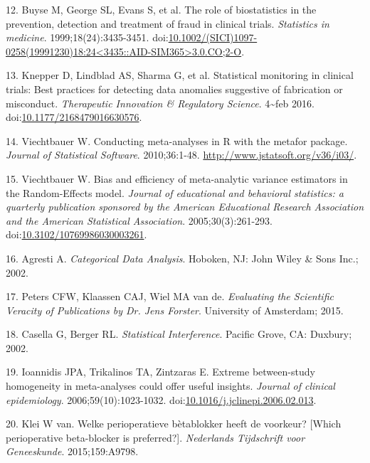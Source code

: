 \documentclass[]{article}
\begin{document}
\hypertarget{ref-Buyse1999-jq}{}
12. Buyse M, George SL, Evans S, et al. The role of biostatistics in the
prevention, detection and treatment of fraud in clinical trials.
\emph{Statistics in medicine}. 1999;18(24):3435-3451.
doi:\href{https://doi.org/10.1002/(SICI)1097-0258(19991230)18:24\%3C3435::AID-SIM365\%3E3.0.CO;2-O}{10.1002/(SICI)1097-0258(19991230)18:24\textless{}3435::AID-SIM365\textgreater{}3.0.CO;2-O}.

\hypertarget{ref-Knepper2016-la}{}
13. Knepper D, Lindblad AS, Sharma G, et al. Statistical monitoring in
clinical trials: Best practices for detecting data anomalies suggestive
of fabrication or misconduct. \emph{Therapeutic Innovation \& Regulatory
Science}. 4\textasciitilde{}feb 2016.
doi:\href{https://doi.org/10.1177/2168479016630576}{10.1177/2168479016630576}.

\hypertarget{ref-viechtbauer2010}{}
14. Viechtbauer W. Conducting meta-analyses in R with the metafor
package. \emph{Journal of Statistical Software}. 2010;36:1-48.
\url{http://www.jstatsoft.org/v36/i03/}.

\hypertarget{ref-viechtbauer2005}{}
15. Viechtbauer W. Bias and efficiency of meta-analytic variance
estimators in the Random-Effects model. \emph{Journal of educational and
behavioral statistics: a quarterly publication sponsored by the American
Educational Research Association and the American Statistical
Association}. 2005;30(3):261-293.
doi:\href{https://doi.org/10.3102/10769986030003261}{10.3102/10769986030003261}.

\hypertarget{ref-agresti2002}{}
16. Agresti A. \emph{Categorical Data Analysis}. Hoboken, NJ: John Wiley
\& Sons Inc.; 2002.

\hypertarget{ref-peters2015}{}
17. Peters CFW, Klaassen CAJ, Wiel MA van de. \emph{Evaluating the
Scientific Veracity of Publications by Dr. Jens Forster}. University of
Amsterdam; 2015.

\hypertarget{ref-casella2002}{}
18. Casella G, Berger RL. \emph{Statistical Interference}. Pacific
Grove, CA: Duxbury; 2002.

\hypertarget{ref-ioannidis2006}{}
19. Ioannidis JPA, Trikalinos TA, Zintzaras E. Extreme between-study
homogeneity in meta-analyses could offer useful insights. \emph{Journal
of clinical epidemiology}. 2006;59(10):1023-1032.
doi:\href{https://doi.org/10.1016/j.jclinepi.2006.02.013}{10.1016/j.jclinepi.2006.02.013}.

\hypertarget{ref-klei2015}{}
20. Klei W van. Welke perioperatieve bètablokker heeft de voorkeur?
{[}Which perioperative beta-blocker is preferred?{]}. \emph{Nederlands
Tijdschrift voor Geneeskunde}. 2015;159:A9798.
\end{document}
